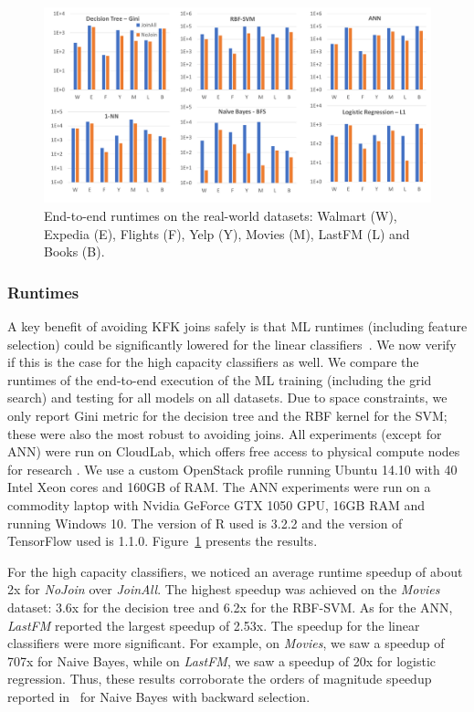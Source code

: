 \documentclass{vldb}
\begin{document}

\begin{figure}[t]
\centering
\includegraphics[width=\linewidth]{histogram.pdf}
\caption{End-to-end runtimes on the real-world datasets: Walmart (W), Expedia (E), Flights (F), Yelp (Y), Movies (M), LastFM (L) and Books (B).}
\label{Figure:runtime}
\end{figure}

\subsubsection*{Runtimes}
A key benefit of avoiding KFK joins safely is that ML runtimes (including feature selection) could be significantly lowered for the linear classifiers~\cite{hamlet}.
We now verify if this is the case for the high capacity classifiers as well. We compare the runtimes of the end-to-end execution of the ML training (including the 
grid search) and testing for all models on all datasets.
Due to space constraints, we only report Gini metric for the decision tree and the RBF kernel for the SVM; these were also the most robust to avoiding joins.
All experiments (except for ANN) were run on CloudLab, which offers free access to physical compute nodes for research \cite{ricci2014introducing}. We use a custom OpenStack profile running Ubuntu 14.10 with 40 Intel Xeon cores and 160GB of RAM.
The ANN experiments were run on a commodity laptop with Nvidia GeForce GTX 1050 GPU, 16GB RAM and running Windows 10. The version of R used is 3.2.2 and the version of TensorFlow used is 1.1.0.
Figure~\ref{Figure:runtime} presents the results.

For the high capacity classifiers, we noticed an average runtime speedup of about 2x for \textit{NoJoin} over \textit{JoinAll}.  The highest speedup was 
achieved on the \textit{Movies} dataset: 3.6x for the decision tree and 6.2x for the RBF-SVM. As for the ANN, \textit{LastFM} reported the 
largest speedup of 2.53x. 
The speedup for the linear classifiers were more significant. For example, on \textit{Movies}, we saw a speedup of 707x for Naive Bayes, while on 
\textit{LastFM}, we saw a speedup of 20x for logistic regression. Thus, these results corroborate the orders of magnitude speedup reported in~\cite{hamlet} 
for Naive Bayes with backward selection.
\end{document}

